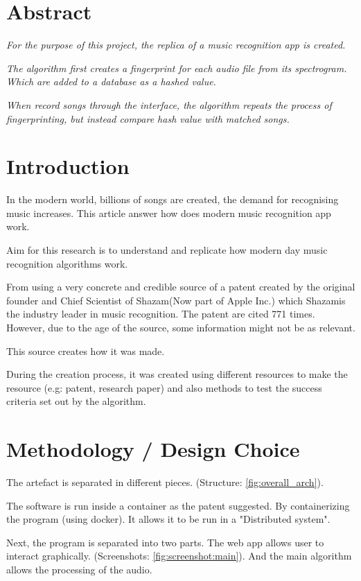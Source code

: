 \chapter*{Abstract}
\textit{For the purpose of this project, the replica of a music recognition app is created.}

\textit{The algorithm first creates a fingerprint for each audio file from its spectrogram. Which are added to a database as a hashed value.}

\textit{When record songs through the interface, the algorithm repeats the process of fingerprinting, but instead compare hash value with matched songs.}
\chapter{Introduction}

In the modern world, billions of songs are created, the demand for recognising music increases. This article answer how does modern music recognition app work.

Aim for this research is to understand and replicate how modern day music recognition algorithms work. 

From using a very concrete and credible source of a patent created by the original founder and Chief Scientist of Shazam\trademark (Now part of Apple Inc\trademark.) \cite{newnham_interview_2023} which Shazam\trademark is the industry leader in music recognition. The patent are cited 771 times. \cite{wang_systems_2013} However, due to the age of the source, some information might not be as relevant.

This source creates how it was made. 

During the creation process, it was created using different resources to make the resource (e.g: patent, research paper) and also methods to test the success criteria set out by the algorithm. 

\chapter{Methodology / Design Choice}
The artefact is separated in different pieces. (Structure: \autoref{fig:overall_arch}).

The software is run inside a container as the patent suggested. By containerizing the program (using docker). It allows it to be run in a "Distributed system".

Next, the program is separated into two parts. The web app allows user to interact graphically. (Screenshots: \autoref{fig:screenshot:main}). And the main algorithm allows the processing of the audio.

